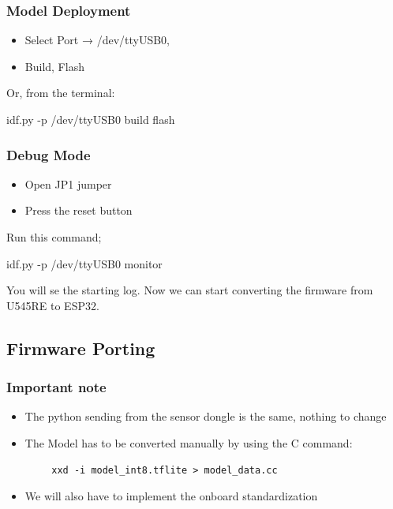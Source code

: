 \subsubsection{Model Deployment}
\begin{itemize}
\item Select Port → /dev/ttyUSB0,
\item Build, Flash
\end{itemize}
Or, from the terminal:

\begin{center}
    idf.py -p /dev/ttyUSB0 build flash
\end{center}

\subsubsection{Debug Mode}
\begin{itemize}
\item Open JP1 jumper
\item Press the reset button
\end{itemize}
Run this command;
\begin{center}
    idf.py -p /dev/ttyUSB0 monitor
\end{center}
You will se the starting log. Now we can start converting the firmware from U545RE to ESP32.

\subsection{Firmware Porting}

\subsubsection{Important note}

\begin{itemize}
\item The python sending from the sensor dongle is the same, nothing to change
\item The Model has to be converted manually by using the C command:
\end{itemize}
\begin{center}
    \begin{verbatim}
        xxd -i model_int8.tflite > model_data.cc
    \end{verbatim}
\end{center}
\begin{itemize}
\item We will also have to implement the onboard standardization
\end{itemize}


